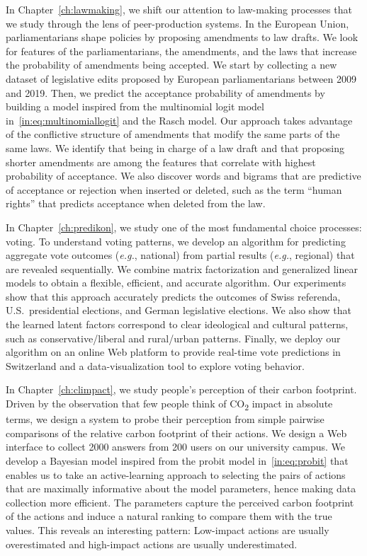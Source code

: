 In Chapter~\ref{ch:lawmaking}, we shift our attention to law-making processes that we study through the lens of peer-production systems.
In the European Union, parliamentarians shape policies by proposing amendments to law drafts.
We look for features of the parliamentarians, the amendments, and the laws that increase the probability of amendments being accepted.
We start by collecting a new dataset of  legislative edits proposed by European parliamentarians between 2009 and 2019.
Then, we predict the acceptance probability of amendments by building a model inspired from the multinomial logit model in~\eqref{in:eq:multinomiallogit} and the Rasch model.
Our approach takes advantage of the conflictive structure of amendments that modify the same parts of the same laws.
We identify that being in charge of a law draft and that proposing shorter amendments are among the features that correlate with highest probability of acceptance.
We also discover words and bigrams that are predictive of acceptance or rejection when inserted or deleted, such as the term ``human rights'' that predicts acceptance when deleted from the law.

In Chapter~\ref{ch:predikon}, we study one of the most fundamental choice processes: voting.
To understand voting patterns, we develop an algorithm for predicting aggregate vote outcomes (\textit{e.g.}, national) from partial results (\textit{e.g.}, regional) that are revealed sequentially.
We combine matrix factorization and generalized linear models to obtain a flexible, efficient, and accurate algorithm.
Our experiments show that this approach accurately predicts the outcomes of Swiss referenda, U.S.\ presidential elections, and German legislative elections.
We also show that the learned latent factors correspond to clear ideological and cultural patterns, such as conservative/liberal and rural/urban patterns.
Finally, we deploy our algorithm on an online Web platform to provide real-time vote predictions in Switzerland and a data-visualization tool to explore voting behavior.

In Chapter~\ref{ch:climpact}, we study people's perception of their carbon footprint.
Driven by the observation that few people think of CO\textsubscript{2} impact in absolute terms, we design a system to probe their perception from simple pairwise comparisons of the relative carbon footprint of their actions.
We design a Web interface to collect 2000 answers from 200 users on our university campus.
We develop a Bayesian model inspired from the probit model in~\eqref{in:eq:probit} that enables us to take an active-learning approach to selecting the pairs of actions that are maximally informative about the model parameters, hence making data collection more efficient.
The parameters capture the perceived carbon footprint of the actions and induce a natural ranking to compare them with the true values.
This reveals an interesting pattern:
Low-impact actions are usually overestimated and high-impact actions are usually underestimated.

